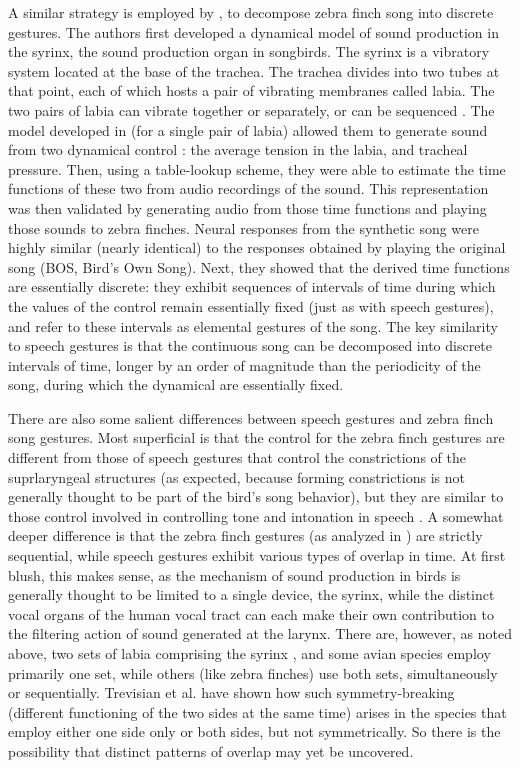 \documentclass[output=paper,
modfonts
]{LSP/langsci}
\begin{document}
A similar strategy is employed by \citet{Amador2013}, to decompose zebra finch song into discrete gestures. The authors first developed a dynamical model of sound production in the syrinx, the sound production organ in songbirds. The syrinx is a vibratory system located at the base of the trachea. The trachea divides into two tubes at that point, each of which hosts a pair of vibrating membranes called labia. The two pairs of labia can vibrate together or separately, or can be sequenced \citep{RiedeGoller}.  The model developed in \citet{Amador2013} (for a single pair of labia) allowed them to generate sound from two dynamical control : the average tension in the labia, and tracheal pressure. Then, using a table-lookup scheme, they were able to estimate the time functions of these two  from audio recordings of the sound. This representation was then validated by generating audio from those time functions and playing those sounds to zebra finches. Neural responses from the synthetic song were highly similar (nearly identical) to the responses obtained by playing the original song (BOS, Bird's Own Song). Next, they showed that the derived time functions are essentially discrete: they exhibit sequences of intervals of time during which the values of the control  remain essentially fixed (just as with speech gestures), and refer to these intervals as elemental gestures of the song. The key similarity to speech gestures is that the continuous song can be decomposed into discrete intervals of time, longer by an order of magnitude than the periodicity of the song, during which the dynamical  are essentially fixed. 

\largerpage
There are also some salient differences between speech gestures and zebra finch song gestures. Most superficial is that the control  for the zebra finch gestures are different from those of speech gestures that control the constrictions of the suprlaryngeal structures (as expected, because forming constrictions is not generally thought to be part of the bird's song behavior), but they are similar to those control  involved in controlling tone and intonation in speech \citep{McGowanSaltz}. 
A somewhat deeper difference is that the zebra finch gestures (as analyzed in \citealt{Amador2013}) are strictly sequential, while speech gestures exhibit various types of overlap in time. At first blush, this makes sense, as the mechanism of sound production in birds is generally thought to be limited to a single device, the syrinx, while the distinct vocal organs of the human vocal tract can each make their own contribution to the filtering action of sound generated at the larynx. There are, however, as noted above, two sets of labia comprising the syrinx \citep{Trevas2007}, and some avian species employ primarily one set, while others (like zebra finches) use both sets, simultaneously or sequentially.   Trevisian et al. \citeyearpar{Trevas2007} have shown how such symmetry-breaking (different functioning of the two sides at the same time) arises in the species that employ either one side only or both sides, but not symmetrically. So there is the possibility that distinct patterns of  overlap may yet be uncovered.
\end{document}
